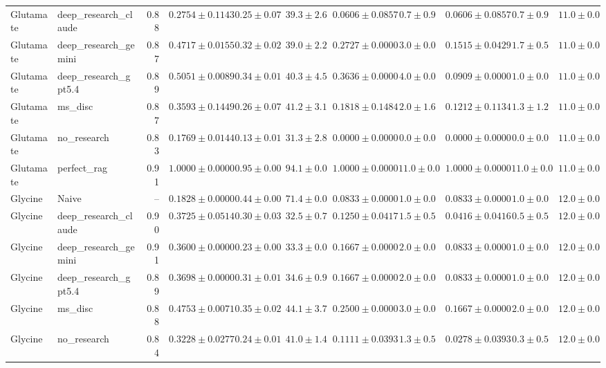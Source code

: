 \begin{table}[htbp]
\begin{tabular}{llrrrrrrrrr}
Glutamate & deep_research_claude & 0.88 & $0.2754 \pm 0.1143$ & $0.25 \pm 0.07$ & $39.3 \pm 2.6$ & $0.0606 \pm 0.0857$ & $0.7 \pm 0.9$ & $0.0606 \pm 0.0857$ & $0.7 \pm 0.9$ & $11.0 \pm 0.0$ \\
Glutamate & deep_research_gemini & 0.87 & $0.4717 \pm 0.0155$ & $0.32 \pm 0.02$ & $39.0 \pm 2.2$ & $0.2727 \pm 0.0000$ & $3.0 \pm 0.0$ & $0.1515 \pm 0.0429$ & $1.7 \pm 0.5$ & $11.0 \pm 0.0$ \\
Glutamate & deep_research_gpt5.4 & 0.89 & $0.5051 \pm 0.0089$ & $0.34 \pm 0.01$ & $40.3 \pm 4.5$ & $0.3636 \pm 0.0000$ & $4.0 \pm 0.0$ & $0.0909 \pm 0.0000$ & $1.0 \pm 0.0$ & $11.0 \pm 0.0$ \\
Glutamate & ms_disc & 0.87 & $0.3593 \pm 0.1449$ & $0.26 \pm 0.07$ & $41.2 \pm 3.1$ & $0.1818 \pm 0.1484$ & $2.0 \pm 1.6$ & $0.1212 \pm 0.1134$ & $1.3 \pm 1.2$ & $11.0 \pm 0.0$ \\
Glutamate & no_research & 0.83 & \cellcolor{red!25}$0.1769 \pm 0.0144$ & $0.13 \pm 0.01$ & $31.3 \pm 2.8$ & $0.0000 \pm 0.0000$ & $0.0 \pm 0.0$ & $0.0000 \pm 0.0000$ & $0.0 \pm 0.0$ & $11.0 \pm 0.0$ \\
Glutamate & perfect_rag & 0.91 & \cellcolor{green!25}$1.0000 \pm 0.0000$ & $0.95 \pm 0.00$ & $94.1 \pm 0.0$ & $1.0000 \pm 0.0000$ & $11.0 \pm 0.0$ & $1.0000 \pm 0.0000$ & $11.0 \pm 0.0$ & $11.0 \pm 0.0$ \\
\midrule
Glycine & Naive & -- & \cellcolor{red!25}$0.1828 \pm 0.0000$ & $0.44 \pm 0.00$ & $71.4 \pm 0.0$ & $0.0833 \pm 0.0000$ & $1.0 \pm 0.0$ & $0.0833 \pm 0.0000$ & $1.0 \pm 0.0$ & $12.0 \pm 0.0$ \\
Glycine & deep_research_claude & 0.90 & $0.3725 \pm 0.0514$ & $0.30 \pm 0.03$ & $32.5 \pm 0.7$ & $0.1250 \pm 0.0417$ & $1.5 \pm 0.5$ & $0.0416 \pm 0.0416$ & $0.5 \pm 0.5$ & $12.0 \pm 0.0$ \\
Glycine & deep_research_gemini & 0.91 & $0.3600 \pm 0.0000$ & $0.23 \pm 0.00$ & $33.3 \pm 0.0$ & $0.1667 \pm 0.0000$ & $2.0 \pm 0.0$ & $0.0833 \pm 0.0000$ & $1.0 \pm 0.0$ & $12.0 \pm 0.0$ \\
Glycine & deep_research_gpt5.4 & 0.89 & $0.3698 \pm 0.0000$ & $0.31 \pm 0.01$ & $34.6 \pm 0.9$ & $0.1667 \pm 0.0000$ & $2.0 \pm 0.0$ & $0.0833 \pm 0.0000$ & $1.0 \pm 0.0$ & $12.0 \pm 0.0$ \\
Glycine & ms_disc & 0.88 & $0.4753 \pm 0.0071$ & $0.35 \pm 0.02$ & $44.1 \pm 3.7$ & $0.2500 \pm 0.0000$ & $3.0 \pm 0.0$ & $0.1667 \pm 0.0000$ & $2.0 \pm 0.0$ & $12.0 \pm 0.0$ \\
Glycine & no_research & 0.84 & $0.3228 \pm 0.0277$ & $0.24 \pm 0.01$ & $41.0 \pm 1.4$ & $0.1111 \pm 0.0393$ & $1.3 \pm 0.5$ & $0.0278 \pm 0.0393$ & $0.3 \pm 0.5$ & $12.0 \pm 0.0$ \\

\end{tabular}
\end{table}
